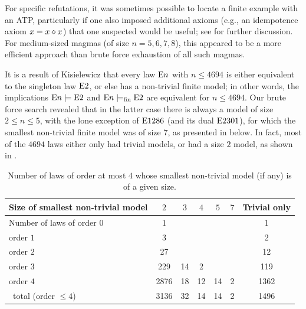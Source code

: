 For specific refutations, it was sometimes possible to locate a finite example with an ATP, particularly if one also imposed additional axioms (e.g., an idempotence axiom $x = x \diamond x$) that one suspected would be useful; see  for further discussion.  For medium-sized magmas (of size $n=5,6,7,8$), this appeared to be a more efficient approach than brute force exhaustion of all such magmas.

It is a result of Kisielewicz \cite{Kisielewicz} that every law $\mathrm{E}n$ with $n \leq 4694$ is either equivalent to the singleton law $\mathrm{E}2$, or else has a non-trivial finite model; in other words, the implications $\mathrm{E}n \models \mathrm{E}2$ and $\mathrm{E}n \models_{\mathrm{fin}} \mathrm{E}2$ are equivalent for $n \leq 4694$.  Our brute force search revealed that in the latter case there is always a model of size $2 \leq n \leq 5$, with the lone exception of $\mathrm{E}1286$ (and its dual $\mathrm{E}2301$), for which the smallest non-trivial finite model was of size $7$, as presented in  below.  In fact, most of the $\num{4694}$ laws either only had trivial models, or had a size $2$ model, as shown in .
\begin{table}
\centering
\caption{Number of laws of order at most $4$ whose smallest non-trivial model (if any) is of a given size.}\label{size-table}
\begin{tabular}{lS[table-format=4]SSSS[table-format=1]S[table-format=4]}
  \toprule
  Size of smallest non-trivial model & {$2$} & {$3$} & {$4$} & {$5$} & {$7$} & {Trivial only} \\
  \midrule
  Number of laws of order $0$ & 1 & & & & & 1 \\
  \phantom{Number of laws of }order $1$ & 3 & & & & & 2 \\
  \phantom{Number of laws of }order $2$ & 27 & & & & & 12 \\
  \phantom{Number of laws of }order $3$ & 229 & 14 & 2 & & & 119 \\
  \phantom{Number of laws of }order $4$ & 2876 & 18 & 12 & 14 & 2 & 1362 \\
  \qquad\qquad\, total (order $\leq 4$) & 3136 & 32 & 14 & 14 & 2 & 1496 \\
  \bottomrule
\end{tabular}
\end{table}

